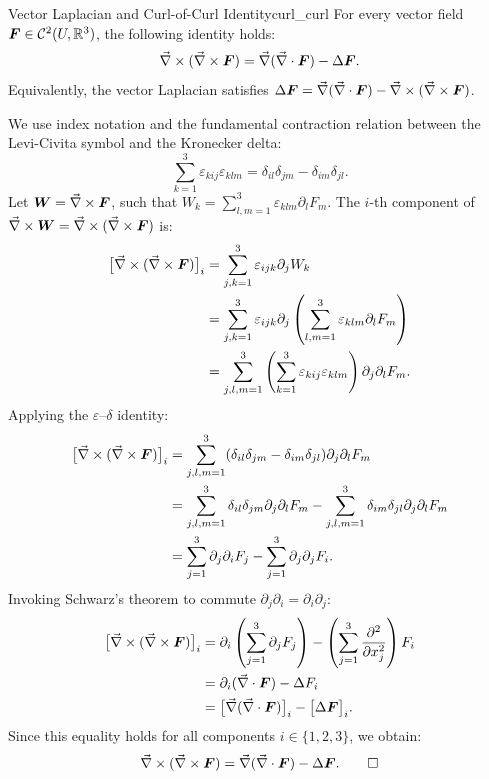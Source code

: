 \begin{theoreme}{Vector Laplacian and Curl-of-Curl Identity}{curl_curl}
For every vector field $\bm{F} \in \mathcal{C}^2(U, \mathbb{R}^3)$, the following identity holds:
\begin{equation}
    \vec{\nabla}\times (\vec{\nabla}\times \bm{F}) = \vec{\nabla} (\vec{\nabla}\cdot \bm{F}) - \Delta \bm{F}.
\end{equation}
Equivalently, the vector Laplacian satisfies $\Delta \bm{F} = \vec{\nabla} (\vec{\nabla}\cdot \bm{F}) - \vec{\nabla}\times (\vec{\nabla}\times \bm{F})$.
\end{theoreme}

\begin{demonstration}
We use index notation and the fundamental contraction relation between the Levi-Civita symbol and the Kronecker delta:
\begin{equation*}
    \sum_{k=1}^3 \varepsilon_{kij} \varepsilon_{klm} = \delta_{il} \delta_{jm} - \delta_{im} \delta_{jl}.
\end{equation*}
Let $\bm{W} = \vec{\nabla}\times \bm{F}$, such that $W_k = \sum_{l,m=1}^3 \varepsilon_{klm} \partial_l F_m$. The $i$-th component of $\vec{\nabla}\times \bm{W} = \vec{\nabla}\times (\vec{\nabla}\times \bm{F})$ is:
\begin{align*}
    \bigl[ \vec{\nabla}\times (\vec{\nabla}\times \bm{F}) \bigr]_i &= \sum_{j,k=1}^3 \varepsilon_{ijk} \partial_j W_k \\
    &= \sum_{j,k=1}^3 \varepsilon_{ijk} \partial_j \left( \sum_{l,m=1}^3 \varepsilon_{klm} \partial_l F_m \right) \\
    &= \sum_{j,l,m=1}^3 \left( \sum_{k=1}^3 \varepsilon_{kij} \varepsilon_{klm} \right) \partial_j \partial_l F_m.
\end{align*}
Applying the $\varepsilon$--$\delta$ identity:
\begin{align*}
    \bigl[ \vec{\nabla}\times (\vec{\nabla}\times \bm{F}) \bigr]_i &= \sum_{j,l,m=1}^3 (\delta_{il} \delta_{jm} - \delta_{im} \delta_{jl}) \partial_j \partial_l F_m \\
    &= \sum_{j,l,m=1}^3 \delta_{il} \delta_{jm} \partial_j \partial_l F_m - \sum_{j,l,m=1}^3 \delta_{im} \delta_{jl} \partial_j \partial_l F_m \\
    &= \sum_{j=1}^3 \partial_j \partial_i F_j - \sum_{j=1}^3 \partial_j \partial_j F_i.
\end{align*}
Invoking Schwarz's theorem to commute $\partial_j \partial_i = \partial_i \partial_j$:
\begin{align*}
    \bigl[ \rot (\rot \bm{F}) \bigr]_i &= \partial_i \left( \sum_{j=1}^3 \partial_j F_j \right) - \left( \sum_{j=1}^3 \pdv[2]{}{x_j} \right) F_i \\
    &= \partial_i (\dive \bm{F}) - \laplacian F_i \\
    &= \bigl[ \grad (\dive \bm{F}) \bigr]_i - \bigl[ \laplacian \bm{F} \bigr]_i.
\end{align*}
Since this equality holds for all components $i \in \{1, 2, 3\}$, we obtain:
\begin{equation*}
    \vec{\nabla}\times (\vec{\nabla}\times \bm{F}) = \vec{\nabla} (\vec{\nabla}\cdot \bm{F}) - \Delta \bm{F}. \qedhere
\end{equation*}
\end{demonstration}


